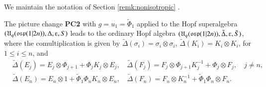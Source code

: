\documentclass[12pt]{amsart}
\theoremstyle{definition}
\theoremstyle{remark}
\numberwithin{equation}{section}
\begin{document}
We maintain the notation of Section \ref{remk:nonisotropic} .

The picture change {\bf PC2} with $g=u_1=\tilde{\Phi}_1$ applied to the Hopf superalgebra
$({{\mathfrak U}}_{q}({{\rm\mathfrak{osp}}}(1|2n)),\Delta,{\varepsilonup},S)$ leads to the ordinary Hopf algebra $({{\mathfrak U}}_{q}({{\rm\mathfrak{osp}}}(1|2n)),{\tilde{\Delta}},{\varepsilonup},{\tilde{S}})$, where the comultiplication is given by ${\tilde{\Delta}}(\sigma_i)=\sigma_i\otimes \sigma_i$, ${\tilde{\Delta}}(K_i)=K_i\otimes K_i$, for $1\le i\le n$, and
\[
\begin{aligned}
&{\tilde{\Delta}}(E_j)=E_j\otimes\Phi_{j+1}+\Phi_jK_j\otimes E_j,\quad {\tilde{\Delta}}(F_j)=F_j\otimes\Phi_{j+1}K_j^{-1}+\Phi_j\otimes F_j, \quad \text{$j\ne n$,}\\
&{\tilde{\Delta}}(E_n)=E_n\otimes 1+\tilde{\Phi}_1 \Phi _nK_n\otimes E_n,\quad {\tilde{\Delta}}(F_n)=F_n\otimes K_n^{-1}+\tilde{\Phi}_1\Phi_n\otimes F_n.
\end{aligned}
\]
\end{document}
